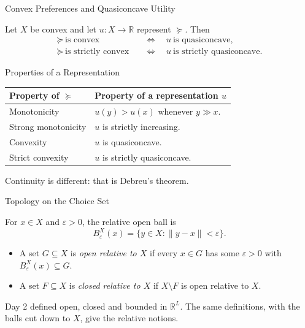 \documentclass[11pt,aspectratio=169,c]{beamer}
\begin{document}
\begin{frame}{Convex Preferences and Quasiconcave Utility}

\begin{propositionbox}[Kreps 2.8(b)]
Let $X$ be convex and let $u:X\to\mathbb{R}$ represent $\succeq$. Then
\[
\begin{aligned}
\succeq\ \text{is convex}
&\quad\Longleftrightarrow\quad
u\ \text{is quasiconcave},\\
\succeq\ \text{is strictly convex}
&\quad\Longleftrightarrow\quad
u\ \text{is strictly quasiconcave}.
\end{aligned}
\]
\end{propositionbox}


\end{frame}

\begin{frame}{Properties of a Representation}
\renewcommand{\arraystretch}{1.35}
\centering
\begin{tabular}{@{}p{}p{}@{}}
\toprule
\textbf{Property of $\succeq$} & \textbf{Property of a representation $u$}\\
\midrule
Monotonicity & $u(y)>u(x)$ whenever $y\gg x$.\\
Strong monotonicity & $u$ is strictly increasing.\\
Convexity & $u$ is quasiconcave.\\
Strict convexity & $u$ is strictly quasiconcave.\\
\bottomrule
\end{tabular}

\vspace{.85em}
Continuity is different: that is Debreu's theorem.
\end{frame}


\begin{frame}{Topology on the Choice Set}

\begin{definitionbox}
For $x\in X$ and $\varepsilon>0$, the relative open ball is
\[
B^X_\varepsilon(x)=\{y\in X:\lVert y-x\rVert<\varepsilon\}.
\]
\begin{itemize}
    \item A set $G\subseteq X$ is \emph{open relative to $X$} if every $x\in G$
    has some $\varepsilon>0$ with $B^X_\varepsilon(x)\subseteq G$.
    \item A set $F\subseteq X$ is \emph{closed relative to $X$} if $X\setminus F$ is open relative to $X$.
\end{itemize}
\end{definitionbox}

Day 2 defined open, closed and bounded in $\mathbb{R}^L$. The same
definitions, with the balls cut down to $X$, give the relative notions.


\end{frame}
\end{document}
